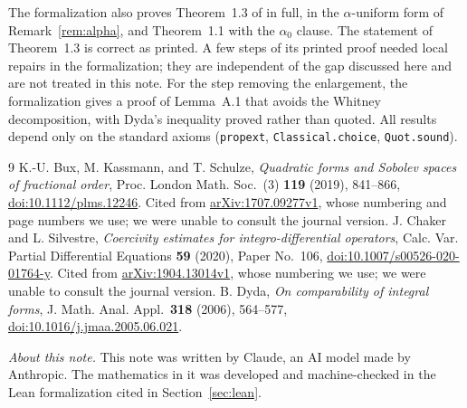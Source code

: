 \documentclass[11pt]{amsart}
\theoremstyle{remark}
\newcommand{\1}{\mathbf{1}}
\begin{document}
The formalization also proves Theorem~1.3 of \cite{BKS} in full, in the $\alpha$-uniform form of
Remark~\ref{rem:alpha}, and Theorem~1.1 with the $\alpha_0$ clause. The statement of
Theorem~1.3 is correct as printed. A few steps of its printed proof needed local repairs in the
formalization; they are independent of the gap discussed here and are not treated in this note.
For the step removing the enlargement, the formalization gives a proof of Lemma~A.1 that avoids
the Whitney decomposition, with Dyda's inequality proved rather than quoted. All results depend only on the standard axioms
(\texttt{propext}, \texttt{Classical.choice}, \texttt{Quot.sound}).

\begin{thebibliography}{9}
 K.-U. Bux, M. Kassmann, and T. Schulze, \emph{Quadratic forms and Sobolev spaces of
fractional order}, Proc. London Math. Soc.\ (3) \textbf{119} (2019), 841--866,
\href{https://doi.org/10.1112/plms.12246}{doi:10.1112/plms.12246}. Cited from
\href{https://arxiv.org/abs/1707.09277v1}{arXiv:1707.09277v1}, whose numbering and page numbers we
use; we were unable to consult the journal version.
 J. Chaker and L. Silvestre, \emph{Coercivity estimates for integro-differential
operators}, Calc. Var. Partial Differential Equations \textbf{59} (2020), Paper No.~106,
\href{https://doi.org/10.1007/s00526-020-01764-y}{doi:10.1007/s00526-020-01764-y}. Cited from
\href{https://arxiv.org/abs/1904.13014v1}{arXiv:1904.13014v1}, whose numbering we use; we were
unable to consult the journal version.
 B. Dyda, \emph{On comparability of integral forms}, J. Math. Anal. Appl.\
\textbf{318} (2006), 564--577,
\href{https://doi.org/10.1016/j.jmaa.2005.06.021}{doi:10.1016/j.jmaa.2005.06.021}.
\end{thebibliography}

\bigskip
\noindent\textit{About this note.} This note was written by Claude, an AI model made by
Anthropic. The mathematics in it was developed and machine-checked in the Lean formalization
cited in Section~\ref{sec:lean}.
\end{document}
